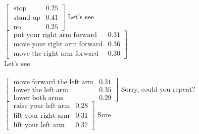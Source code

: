 \begin{Transcript}[p!]
\vspace{4mm} \hspace{1cm} 
\begin{dialogue} 
 $\begin{bmatrix}\text{ stop} & 0.25 \\
\text{ stand up} & 0.41 \\
\text{ no} & 0.25 \end{bmatrix}$ \vspace{3mm}
 Let's see \vspace{1mm} \\
 \vspace{3mm}
  $\begin{bmatrix}\text{ put your right arm forward} & 0.31 \\
\text{ move your right arm forward} & 0.36 \\
\text{ move the right arm forward} & 0.30 \end{bmatrix}$ \vspace{2mm} \\
 Let's see \vspace{1mm} \\
 \\
 \vspace{3mm}
 $\begin{bmatrix}\text{ move forward the left arm} & 0.31 \\
\text{ lower the left arm} & 0.35 \\
\text{ lower both arms} & 0.29 \end{bmatrix}$ \vspace{3mm}
 Sorry, could you repeat? \vspace{3mm}
 $\begin{bmatrix}\text{ raise your left arm} & 0.28 \\
\text{ lift your right arm} & 0.31 \\
\text{ lift your left arm} & 0.37 \end{bmatrix}$ \vspace{3mm}
 Sure \vspace{1mm} \\
 \\

\end{dialogue}
\end{Transcript}
